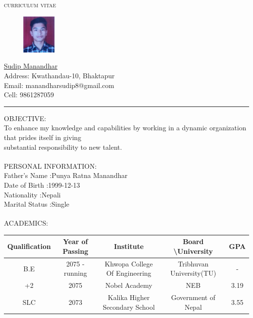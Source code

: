 \documentclass[11pt]{article}
\begin{document}
\begin{center}
{\huge \textsc{curriculum vitae}} 
\end{center}
\begin{table}[!hbt]
\begin{figure}
\includegraphics[width=0.15\textwidth]{phoyo.jpg}
\end{figure} \hspace{1in}
\begin{flushright}
 \underline{\Huge Sudip Manandhar}\\
 \smallskip
Address: Kwathandau-10, Bhaktapur \\
Email: manandharsudip8@gmail.com\\
Cell: 9861287059
\end{flushright}
\end{table}
\begin{center}
\rule{18.5cm}{0.1cm}
\end{center}
{\large OBJECTIVE:}\\
To enhance my knowledge and capabilities by working in a dynamic organization that prides itself in giving\\ substantial responsibility to new talent.\\
\\ 
{\large PERSONAL INFORMATION:}\\
Father's Name \hspace{1in}:Punya Ratna Manandhar\\
Date of Birth \hspace{1.075in}:1999-12-13\\
Nationality \hspace{1.225in}:Nepali\\
Marital Status \hspace{1in}:Single\\
\\
{\large ACADEMICS:}
\begin{table}[!hbt]
\centering
\begin{tabular}{|c|c|c|c|c|}
\hline 
\textbf{Qualification} & \textbf{Year of Passing} & \textbf{Institute} & \textbf{Board \textbackslash University} & \textbf{GPA} \\ 
\hline 
B.E & 2075 - running & Khwopa College Of Engineering & Tribhuvan University(TU) & - \\ 
\hline 
+2 & 2075 & Nobel Academy & NEB & 3.19 \\ 
\hline 
SLC & 2073 & Kalika Higher Secondary School & Government of Nepal & 3.55 \\ 
\hline 
\end{tabular}
\end{table}\\
\end{document}

